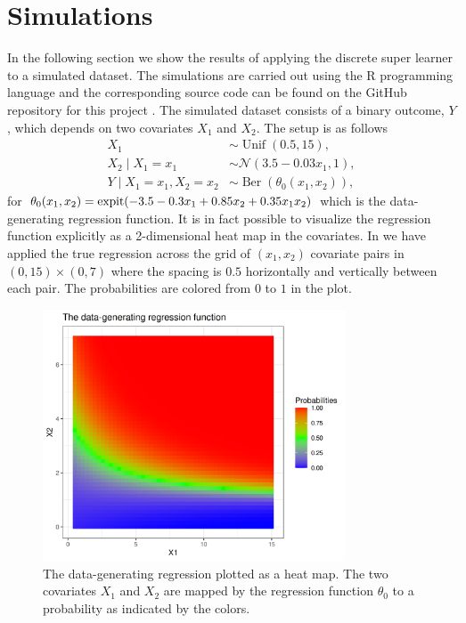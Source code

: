 \documentclass[./main.tex]{subfiles}
\begin{document}
\section{Simulations} \label{sec:simulations}
In the following section we show the results of applying the discrete super learner to a simulated dataset. The simulations are carried out using the R programming language and the corresponding source code can be found on the GitHub repository for this project \parencite{github}. The simulated dataset consists of a binary outcome, $Y$, which depends on two covariates $X_1$ and $X_2$. The setup is as follows
\begin{align*}
    X_1 &\sim \operatorname{Unif}(0.5, 15),\\
    X_2 \mid X_1 = x_1 &\sim \mathcal{N}(3.5-0.03x_1, 1),\\
    Y \mid X_1 = x_1, X_2 = x_2 &\sim \operatorname{Ber}(\theta_0(x_1, x_2)),
\end{align*}
for $\theta_0(x_1, x_2) = \operatorname{expit}({-3.5 - 0.3x_1 + 0.85x_2 + 0.35x_1x_2})$ which is the data-generating regression function. It is in fact possible to visualize the regression function explicitly as a 2-dimensional heat map in the covariates. In  we have applied the true regression across the grid of $ (x_1, x_2) $ covariate pairs in $ (0, 15) \times (0,7) $ where the spacing is $ 0.5 $ horizontally and vertically between each pair. The probabilities are colored from $ 0 $ to $ 1 $ in the plot. 
\begin{figure}[H]
    \centering
    \includegraphics[width=0.8\textwidth]{figures/trueplot.png}
    \caption{The data-generating regression plotted as a heat map. The two covariates $ X_1 $ and $ X_2 $ are mapped by the regression function $ \theta_0 $ to a probability as indicated by the colors.}
    \label{fig:trueplot}
\end{figure}
\end{document}
